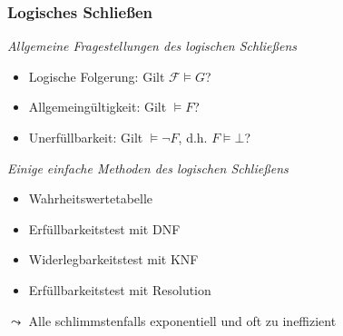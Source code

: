 \documentclass[aspectratio=1610,onlymath]{beamer}
\begin{document}
\maketitle


\begin{frame}\frametitle{Logisches Schließen}

\emph{Allgemeine Fragestellungen des logischen Schließens}
\begin{itemize}
\item Logische Folgerung: Gilt $\mathcal{F}\models G$?
\item Allgemeingültigkeit: Gilt $\models F$?
\item Unerfüllbarkeit: Gilt $\models \neg F$, d.h. $F\models\bot$?
\end{itemize}\bigskip

\emph{Einige einfache Methoden des logischen Schließens}
\begin{itemize}
\item Wahrheitswertetabelle
\item Erfüllbarkeitstest mit DNF
\item Widerlegbarkeitstest mit KNF
\item Erfüllbarkeitstest mit Resolution
\end{itemize}
$\leadsto$ Alle schlimmstenfalls exponentiell und oft zu ineffizient

\end{frame}

\end{document}
